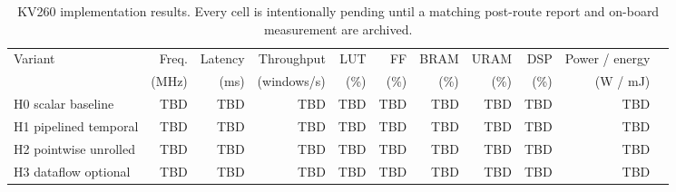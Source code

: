 \begin{table}[t]
\caption{KV260 implementation results. Every cell is intentionally pending
until a matching post-route report and on-board measurement are archived.}
\label{tab:kv260-results}
\centering
\footnotesize
\begin{tabular}{lrrrrrrrrrr}
\toprule
Variant & Freq. & Latency & Throughput & LUT & FF & BRAM & URAM & DSP & Power / energy \\
& (MHz) & (ms) & (windows/s) & (\%) & (\%) & (\%) & (\%) & (\%) & (W / mJ) \\
\midrule
H0 scalar baseline & TBD & TBD & TBD & TBD & TBD & TBD & TBD & TBD & TBD \\
H1 pipelined temporal & TBD & TBD & TBD & TBD & TBD & TBD & TBD & TBD & TBD \\
H2 pointwise unrolled & TBD & TBD & TBD & TBD & TBD & TBD & TBD & TBD & TBD \\
H3 dataflow optional & TBD & TBD & TBD & TBD & TBD & TBD & TBD & TBD & TBD \\
\bottomrule
\end{tabular}
\end{table}
